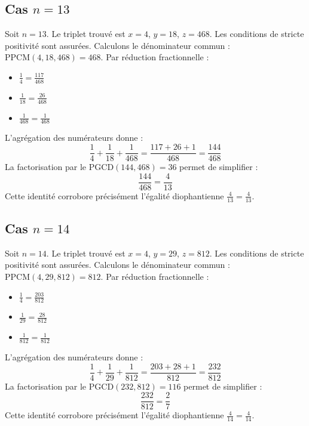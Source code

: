 \documentclass[11pt,a4paper]{article}
\begin{document}
\subsection{Cas $n = 13$}
Soit $n = 13$. Le triplet trouvé est $x = 4$, $y = 18$, $z = 468$.
Les conditions de stricte positivité sont assurées.
Calculons le dénominateur commun : $\text{PPCM}(4, 18, 468) = 468$.
Par réduction fractionnelle :
\begin{itemize}
    \item $\frac{1}{4} = \frac{117}{468}$
    \item $\frac{1}{18} = \frac{26}{468}$
    \item $\frac{1}{468} = \frac{1}{468}$
\end{itemize}
L'agrégation des numérateurs donne :
$$ \frac{1}{4} + \frac{1}{18} + \frac{1}{468} = \frac{117 + 26 + 1}{468} = \frac{144}{468} $$
La factorisation par le $\text{PGCD}(144, 468) = 36$ permet de simplifier :
$$ \frac{144}{468} = \frac{4}{13} $$
Cette identité corrobore précisément l'égalité diophantienne $\frac{4}{13} = \frac{4}{13}$.

\subsection{Cas $n = 14$}
Soit $n = 14$. Le triplet trouvé est $x = 4$, $y = 29$, $z = 812$.
Les conditions de stricte positivité sont assurées.
Calculons le dénominateur commun : $\text{PPCM}(4, 29, 812) = 812$.
Par réduction fractionnelle :
\begin{itemize}
    \item $\frac{1}{4} = \frac{203}{812}$
    \item $\frac{1}{29} = \frac{28}{812}$
    \item $\frac{1}{812} = \frac{1}{812}$
\end{itemize}
L'agrégation des numérateurs donne :
$$ \frac{1}{4} + \frac{1}{29} + \frac{1}{812} = \frac{203 + 28 + 1}{812} = \frac{232}{812} $$
La factorisation par le $\text{PGCD}(232, 812) = 116$ permet de simplifier :
$$ \frac{232}{812} = \frac{2}{7} $$
Cette identité corrobore précisément l'égalité diophantienne $\frac{4}{14} = \frac{4}{14}$.
\end{document}
